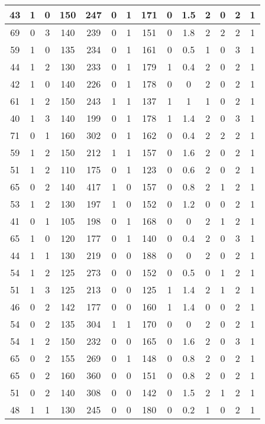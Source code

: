 \documentclass{article}
\begin{document}
\begin{longtable}{|c|c|c|c|c|c|c|c|c|c|c|c|c|c|}
43 & 1 & 0 & 150 & 247 & 0 & 1 & 171 & 0 & 1.5 & 2 & 0 & 2 & 1 \\ \hline
69 & 0 & 3 & 140 & 239 & 0 & 1 & 151 & 0 & 1.8 & 2 & 2 & 2 & 1 \\ \hline
59 & 1 & 0 & 135 & 234 & 0 & 1 & 161 & 0 & 0.5 & 1 & 0 & 3 & 1 \\ \hline
44 & 1 & 2 & 130 & 233 & 0 & 1 & 179 & 1 & 0.4 & 2 & 0 & 2 & 1 \\ \hline
42 & 1 & 0 & 140 & 226 & 0 & 1 & 178 & 0 & 0 & 2 & 0 & 2 & 1 \\ \hline
61 & 1 & 2 & 150 & 243 & 1 & 1 & 137 & 1 & 1 & 1 & 0 & 2 & 1 \\ \hline
40 & 1 & 3 & 140 & 199 & 0 & 1 & 178 & 1 & 1.4 & 2 & 0 & 3 & 1 \\ \hline
71 & 0 & 1 & 160 & 302 & 0 & 1 & 162 & 0 & 0.4 & 2 & 2 & 2 & 1 \\ \hline
59 & 1 & 2 & 150 & 212 & 1 & 1 & 157 & 0 & 1.6 & 2 & 0 & 2 & 1 \\ \hline
51 & 1 & 2 & 110 & 175 & 0 & 1 & 123 & 0 & 0.6 & 2 & 0 & 2 & 1 \\ \hline
65 & 0 & 2 & 140 & 417 & 1 & 0 & 157 & 0 & 0.8 & 2 & 1 & 2 & 1 \\ \hline
53 & 1 & 2 & 130 & 197 & 1 & 0 & 152 & 0 & 1.2 & 0 & 0 & 2 & 1 \\ \hline
41 & 0 & 1 & 105 & 198 & 0 & 1 & 168 & 0 & 0 & 2 & 1 & 2 & 1 \\ \hline
65 & 1 & 0 & 120 & 177 & 0 & 1 & 140 & 0 & 0.4 & 2 & 0 & 3 & 1 \\ \hline
44 & 1 & 1 & 130 & 219 & 0 & 0 & 188 & 0 & 0 & 2 & 0 & 2 & 1 \\ \hline
54 & 1 & 2 & 125 & 273 & 0 & 0 & 152 & 0 & 0.5 & 0 & 1 & 2 & 1 \\ \hline
51 & 1 & 3 & 125 & 213 & 0 & 0 & 125 & 1 & 1.4 & 2 & 1 & 2 & 1 \\ \hline
46 & 0 & 2 & 142 & 177 & 0 & 0 & 160 & 1 & 1.4 & 0 & 0 & 2 & 1 \\ \hline
54 & 0 & 2 & 135 & 304 & 1 & 1 & 170 & 0 & 0 & 2 & 0 & 2 & 1 \\ \hline
54 & 1 & 2 & 150 & 232 & 0 & 0 & 165 & 0 & 1.6 & 2 & 0 & 3 & 1 \\ \hline
65 & 0 & 2 & 155 & 269 & 0 & 1 & 148 & 0 & 0.8 & 2 & 0 & 2 & 1 \\ \hline
65 & 0 & 2 & 160 & 360 & 0 & 0 & 151 & 0 & 0.8 & 2 & 0 & 2 & 1 \\ \hline
51 & 0 & 2 & 140 & 308 & 0 & 0 & 142 & 0 & 1.5 & 2 & 1 & 2 & 1 \\ \hline
48 & 1 & 1 & 130 & 245 & 0 & 0 & 180 & 0 & 0.2 & 1 & 0 & 2 & 1 \\ \hline

\end{longtable}
\end{document}

